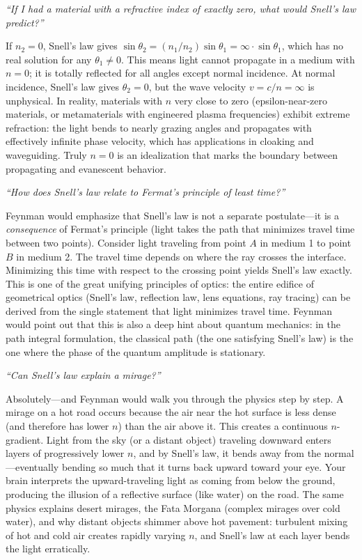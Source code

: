 \textit{``If I had a material with a refractive index of exactly zero, what would Snell's law predict?''}

If $n_2 = 0$, Snell's law gives $\sin\theta_2 = (n_1/n_2)\sin\theta_1 = \infty \cdot \sin\theta_1$, which has no real solution for any $\theta_1 \neq 0$. This means light cannot propagate in a medium with $n = 0$; it is totally reflected for all angles except normal incidence. At normal incidence, Snell's law gives $\theta_2 = 0$, but the wave velocity $v = c/n = \infty$ is unphysical. In reality, materials with $n$ very close to zero (epsilon-near-zero materials, or metamaterials with engineered plasma frequencies) exhibit extreme refraction: the light bends to nearly grazing angles and propagates with effectively infinite phase velocity, which has applications in cloaking and waveguiding. Truly $n = 0$ is an idealization that marks the boundary between propagating and evanescent behavior.

\textit{``How does Snell's law relate to Fermat's principle of least time?''}

Feynman would emphasize that Snell's law is not a separate postulate---it is a \emph{consequence} of Fermat's principle (light takes the path that minimizes travel time between two points). Consider light traveling from point $A$ in medium 1 to point $B$ in medium 2. The travel time depends on where the ray crosses the interface. Minimizing this time with respect to the crossing point yields Snell's law exactly. This is one of the great unifying principles of optics: the entire edifice of geometrical optics (Snell's law, reflection law, lens equations, ray tracing) can be derived from the single statement that light minimizes travel time. Feynman would point out that this is also a deep hint about quantum mechanics: in the path integral formulation, the classical path (the one satisfying Snell's law) is the one where the phase of the quantum amplitude is stationary.

\textit{``Can Snell's law explain a mirage?''}

Absolutely---and Feynman would walk you through the physics step by step. A mirage on a hot road occurs because the air near the hot surface is less dense (and therefore has lower $n$) than the air above it. This creates a continuous $n$-gradient. Light from the sky (or a distant object) traveling downward enters layers of progressively lower $n$, and by Snell's law, it bends away from the normal---eventually bending so much that it turns back upward toward your eye. Your brain interprets the upward-traveling light as coming from below the ground, producing the illusion of a reflective surface (like water) on the road. The same physics explains desert mirages, the Fata Morgana (complex mirages over cold water), and why distant objects shimmer above hot pavement: turbulent mixing of hot and cold air creates rapidly varying $n$, and Snell's law at each layer bends the light erratically.

